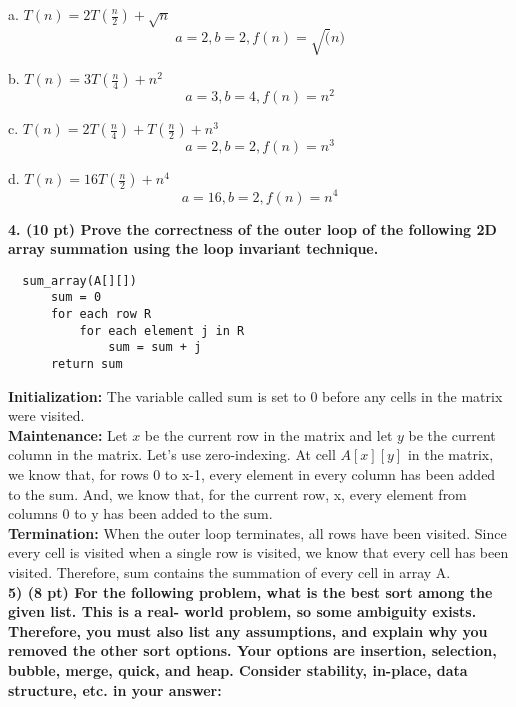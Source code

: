 \documentclass[12pt, a4paper]{article}
\begin{document}
  a. $ T(n) = 2T \left( \frac{n}{2} \right) + \sqrt{n} $ \\

  \[
    a=2, b=2, f(n)=\sqrt(n)
  \]

  b. $ T(n) = 3T \left( \frac{n}{4} \right) + n^2 $ \\

  \[
    a=3, b=4, f(n)=n^2
  \]

  c. $ T(n) = 2T \left( \frac{n}{4} \right) + T \left( \frac{n}{2} \right) + n^3 $ \\

  \[
    a=2, b=2, f(n) = n^3
  \]


  d. $ T(n) = 16T \left( \frac{n}{2} \right) + n^4 $ \\

  \[
    a=16, b=2, f(n) = n^4
  \]


\newpage
\textbf{4. (10 pt) Prove the correctness of the outer loop of the following 2D array summation using
the loop invariant technique.}

\begin{lstlisting}
  sum_array(A[][])
      sum = 0
      for each row R
          for each element j in R
              sum = sum + j
      return sum
\end{lstlisting}

\textbf{Initialization:} The variable called sum is set to 0 before any cells in the matrix were visited. \\

\textbf{Maintenance:} Let $x$ be the current row in the matrix and let $y$ be the current column in the matrix.
Let's use zero-indexing. At cell $A[x][y]$ in the matrix, we know that, for rows 0 to x-1, every element in every column
has been added to the sum. And, we know that, for the current row, x, every element from 
columns 0 to y has been added to the sum.  \\

\textbf{Termination:} When the outer loop terminates, all rows have been visited. Since every cell is visited 
when a single row is visited, we know that every cell has been visited. Therefore, sum contains the summation of
every cell in array A. \\

\textbf{5) (8 pt) For the following problem, what is the best sort among the given list. This is a real-
world problem, so some ambiguity exists. Therefore, you must also list any assumptions,
and explain why you removed the other sort options. Your options are insertion, selection,
bubble, merge, quick, and heap. Consider stability, in-place, data structure, etc. in your
answer: }\\ 
\end{document}
